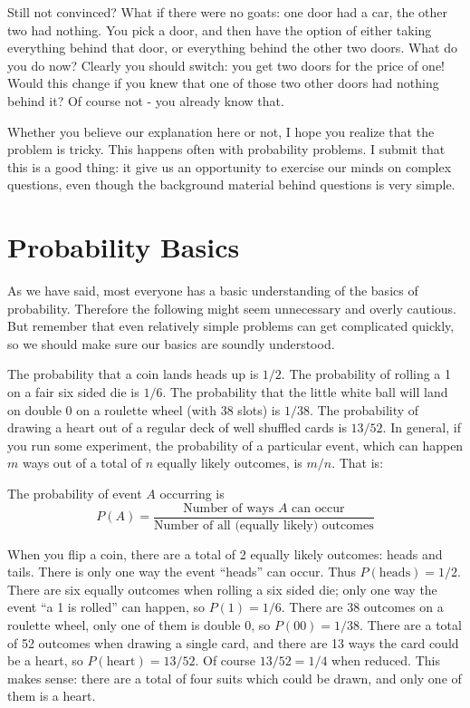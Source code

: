 Still not convinced?  What if there were no goats: one door had a car, the other two had nothing.  You pick a door, and then have the option of either taking everything behind that door, or everything behind the other two doors.  What do you do now?  Clearly you should switch: you get two doors for the price of one!  Would this change if you knew that one of those two other doors had nothing behind it? Of course not - you already know that.

Whether you believe our explanation here or not, I hope you realize that the problem is tricky.  This happens often with probability problems.  I submit that this is a good thing: it give us an opportunity to exercise our minds on complex questions, even though the background material behind questions is very simple.  

\section{Probability Basics}

As we have said, most everyone has a basic understanding of the basics of probability.  Therefore the following might seem unnecessary and overly cautious.  But remember that even relatively simple problems can get complicated quickly, so we should make sure our basics are soundly understood.

The probability that a coin lands heads up is $1/2$.  The probability of rolling a 1 on a fair six sided die is $1/6$.  The probability that the little white ball will land on double 0 on a roulette wheel (with 38 slots) is $1/38$. The probability of drawing a heart out of a regular deck of well shuffled cards is $13/52$.  In general, if you run some experiment, the probability of a particular event, which can happen $m$ ways out of a total of $n$ equally likely outcomes, is $m/n$.  That is:

\begin{definition}
 The probability of event $A$ occurring is
\[P(A) = \frac{\mbox{Number of ways $A$ can occur}}{\mbox{Number of all (equally likely) outcomes}}\]
\end{definition}

When you flip a coin, there are a total of 2 equally likely outcomes: heads and tails.  There is only one way the event ``heads'' can occur.  Thus $P(\mbox{heads}) = 1/2$.  There are six equally outcomes when rolling a six sided die; only one way the event ``a 1 is rolled'' can happen, so $P(1) = 1/6$.  There are 38 outcomes on a roulette wheel, only one of them is double 0, so $P(00) = 1/38$.  There are a total of 52 outcomes when drawing a single card, and there are 13 ways the card could be a heart, so $P(\mbox{heart}) = 13/52$.  Of course $13/52 = 1/4$ when reduced.  This makes sense: there are a total of four suits which could be drawn, and only one of them is a heart.


